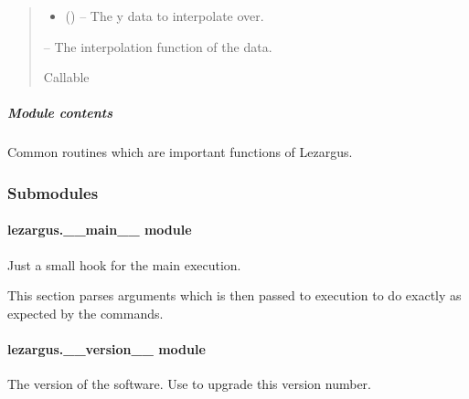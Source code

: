\documentclass[letterpaper,11pt,english]{sphinxmanual}
\begin{document}
\begin{savenotes}
\begin{fulllineitems}
\begin{quote}
\begin{description}
\begin{itemize}
\item {} 
\sphinxAtStartPar
{} () – The y data to interpolate over.

\end{itemize}

\sphinxAtStartPar
{} – The interpolation function of the data.

\sphinxAtStartPar
Callable

\end{description}\end{quote}

\end{fulllineitems}\end{savenotes}



\subparagraph{Module contents}
\label{\detokenize{code/lezargus.library:module-lezargus.library}}\label{\detokenize{code/lezargus.library:module-contents}}
\sphinxAtStartPar
Common routines which are important functions of Lezargus.


\subsubsection{Submodules}
\label{\detokenize{code/lezargus:submodules}}
\sphinxstepscope


\paragraph{lezargus.\_\_main\_\_ module}
\label{\detokenize{code/lezargus.__main__:module-lezargus.__main__}}\label{\detokenize{code/lezargus.__main__:lezargus-main-module}}\label{\detokenize{code/lezargus.__main__::doc}}
\sphinxAtStartPar
Just a small hook for the main execution.

\sphinxAtStartPar
This section parses arguments which is then passed to execution to do exactly
as expected by the commands.

\sphinxstepscope


\paragraph{lezargus.\_\_version\_\_ module}
\label{\detokenize{code/lezargus.__version__:module-lezargus.__version__}}\label{\detokenize{code/lezargus.__version__:lezargus-version-module}}\label{\detokenize{code/lezargus.__version__::doc}}
\sphinxAtStartPar
The version of the software. Use  to upgrade this version number.
\end{document}
